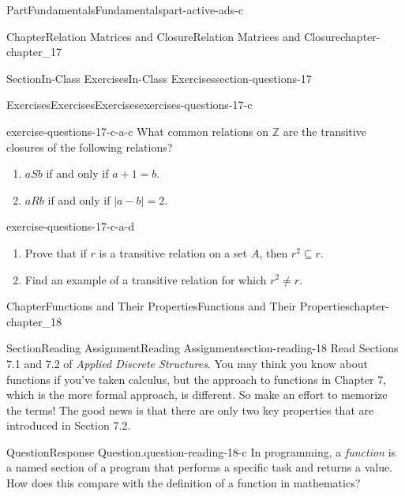 \documentclass[oneside,10pt,]{book}
\numberwithin{equation}{section}
\begin{document}
\begin{partptx}{Part}{Fundamentals}{}{Fundamentals}{}{}{part-active-ads-c}
\begin{chapterptx}{Chapter}{Relation Matrices and Closure}{}{Relation Matrices and Closure}{}{}{chapter-chapter_17}
\begin{sectionptx}{Section}{In-Class Exercises}{}{In-Class Exercises}{}{}{section-questions-17}
\begin{exercises-subsection-numberless}{Exercises}{Exercises}{}{Exercises}{}{}{exercises-questions-17-c}
\begin{exercisegroup}
\begin{divisionexerciseeg}{3}{}{}{exercise-questions-17-c-a-c}
What common relations on \(\mathbb{Z}\) are the transitive closures of the following relations?%
\par
%
\begin{enumerate}[label=(\alph*)]
\item{}\(a S b\) if and only if \(a + 1 = b\).%
\item{}\(a R b\) if and only if \(| a - b | = 2\).%
\end{enumerate}
%
\end{divisionexerciseeg}%
\begin{divisionexerciseeg}{4}{}{}{exercise-questions-17-c-a-d}%
%
\begin{enumerate}[label=(\alph*)]
\item{}Prove that if \(r\) is a transitive relation on a set \(A\), then \(r^2 \subseteq  r\).%
\item{}Find an example of a transitive relation for which \(r^2\neq r\).%
\end{enumerate}
%
\end{divisionexerciseeg}%
\end{exercisegroup}
\par\medskip\noindent
\end{exercises-subsection-numberless}
\end{sectionptx}
\end{chapterptx}
%
\typeout{************************************************}
\typeout{************************************************}
%
\begin{chapterptx}{Chapter}{Functions and Their Properties}{}{Functions and Their Properties}{}{}{chapter-chapter_18}
\renewcommand*{\chaptername}{Chapter}
%
%
%
\typeout{************************************************}
\typeout{************************************************}
%
\begin{sectionptx}{Section}{Reading Assignment}{}{Reading Assignment}{}{}{section-reading-18}
Read Sections 7.1 and 7.2 of \emph{Applied Discrete Structures}.  You may think you know about functions if you've taken calculus, but the approach to functions in Chapter 7, which is the more formal approach, is different. So make an effort to memorize the terms!  The good news is that there are only two key properties that are introduced in Section 7.2.%
\begin{question}{Question}{Response Question.}{question-reading-18-c}%
In programming, a \emph{function} is a named section of a program that performs a specific task and returns a value.  How does this compare with the definition of a function in mathematics?%

\end{question}
\end{sectionptx}
\end{chapterptx}
\end{partptx}
\end{document}

